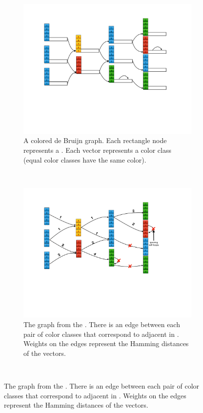 \begin{figure}[t!]
    \captionsetup[subfigure]{justification=justified}
    \centering
    \begin{subfigure}[t]{0.49\textwidth}
        \captionsetup{width=0.7\columnwidth}
        \centering
        \includegraphics[width=0.7\columnwidth, trim={1in 2.5in 1.5in 1in},clip]{figs/mantis/cdbg}
        \caption{A colored de Bruijn graph.  Each rectangle node represents a \kmer.
        Each vector represents a color class (equal color classes have the same color).}
        \label{subfig-cdbg}
    \end{subfigure}%
    ~
    \begin{subfigure}[t]{0.49\textwidth}
        \captionsetup{width=0.7\columnwidth}
        \centering
        \includegraphics[width=0.7\columnwidth, trim={1in 2.5in 1.5in 1in},clip]{figs/mantis/cc}
        \caption{The \cc graph from the \cdbg. There is an edge between each pair of color classes
        that correspond to adjacent \kmers in \cdbg.
        Weights on the edges represent the Hamming distances of the \cc vectors.}
        \label{subfig-cc}
        \vspace{0.2in}
    \end{subfigure}
    ~


\end{figure}
